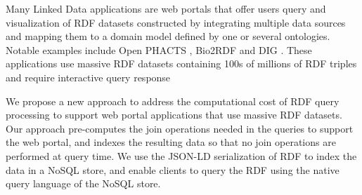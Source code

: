 Many Linked Data applications are web portals that offer users query and visualization of RDF datasets constructed by integrating multiple data sources and mapping them to a domain model defined by one or several ontologies.
Notable examples include Open PHACTS \cite{Groth_Loizou_Gray_Goble_Harland_Pettifer_2014}, Bio2RDF \cite{callahan2013bio2rdf} and DIG \cite{szekely2015building}.
These applications use massive RDF datasets containing 100s of millions of RDF triples and require interactive query response

We propose a new approach to address the computational cost of RDF query processing to support web portal applications that use massive RDF datasets.
Our approach pre-computes the join operations needed in the queries to support the web portal, and indexes the resulting data so that no join operations are performed at query time.
We use the JSON-LD serialization of RDF \cite{Lanthaler:2012:UJC:2307819.2307827} to index the data in a NoSQL store, and enable clients to query the RDF using the native query language of the NoSQL store.

